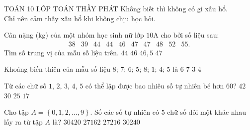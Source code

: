 \begin{name}
	{\tenchude}
	{TOÁN 10}
	{LỚP TOÁN THẦY PHÁT}
	{{Không biết thì không có gì xấu hổ.\\ Chỉ nên cảm thấy xấu hổ khi không chịu học hỏi.}}
\end{name}
\TN
\begin{ex}%
Cân nặng (kg) của một nhóm học sinh nữ lớp $10$A cho bởi số liệu sau:
\[
\begin{array}{llllllllll}
38 & 39 & 44 & 44 & 46 & 47 & 47 & 48 & 52 & 55.
\end{array}
\]
Tìm số trung vị của mẫu số liệu trên.
\choice
{$44$}
{$46$}
{\True $46{,}5$}
{$47$}
\end{ex}

\begin{ex}%
Khoảng biến thiên của mẫu số liệu $8$; $7$; $6$; $5$; $8$; $1$; $4$; $5$ là
\choice
{$6$}
{\True $7$}
{$3$}
{$4$}
\end{ex}

\begin{ex}%
Từ các chữ số $1$, $2$, $3$, $4$, $5$ có thể lập được bao nhiêu số tự nhiên bé hơn $60$?
\choice
{$42$}
{\True $30$}
{$25$}
{$17$}
\end{ex}

\begin{ex}%
Cho tập $A=\left\{{0,1, 2,\ldots ,9}\right\}.$ Số các số tự nhiên có $5$ chữ số đôi một khác nhau lấy ra từ tập $ A$ là?
\choice
{$30420$}
{$27162$}
{\True $27216$}
{$30240$}
\end{ex}

